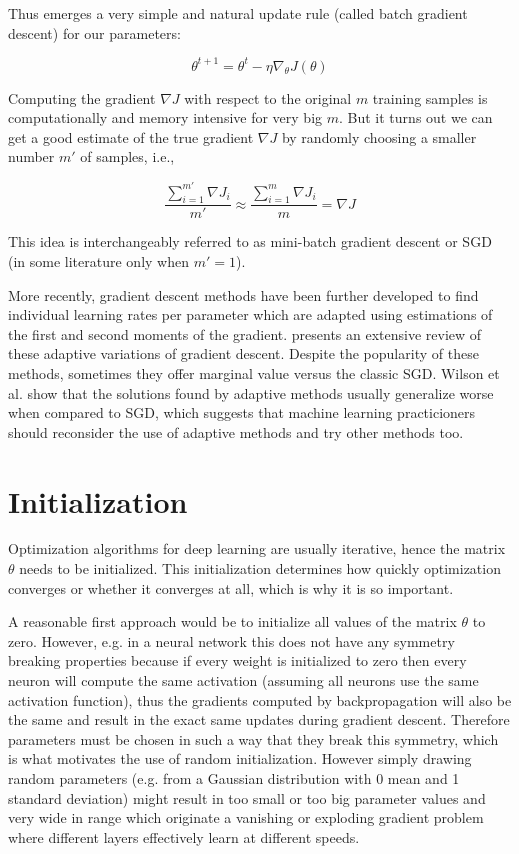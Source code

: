 Thus emerges a very simple and natural update rule (called batch gradient descent) for our parameters:

$$
\theta^{t+1} = \theta^t - \eta \nabla_{\theta} J(\theta)
$$

Computing the gradient $\nabla J$ with respect to the original $m$ training samples is computationally and memory intensive for very big $m$. But it turns out we can get a good estimate of the true gradient $\nabla J$ by randomly choosing a smaller number $m'$ of samples, i.e.,

$$
\frac{\sum_{i=1}^{m'} \nabla J_i}{m'} \approx \frac{\sum_{i=1}^m \nabla J_{i}}{m} = \nabla J
$$

This idea is interchangeably referred to as mini-batch gradient descent or \ac{SGD} (in some literature only when $m' = 1$).

More recently, gradient descent methods have been further developed to find individual learning rates per parameter which are adapted using estimations of the first and second moments of the gradient. \citeauthor{ruder2016} \cite{ruder2016} presents an extensive review of these adaptive variations of gradient descent. Despite the popularity of these methods, sometimes they offer marginal value versus the classic \ac{SGD}. Wilson et al. \cite{wilson2017} show that the solutions found by adaptive methods usually generalize worse when compared to \ac{SGD}, which suggests that machine learning practicioners should reconsider the use of adaptive methods and try other methods too.

\section{Initialization}

Optimization algorithms for deep learning are usually iterative, hence the matrix $\theta$ needs to be initialized. This initialization determines how quickly optimization converges or whether it converges at all, which is why it is so important.

A reasonable first approach would be to initialize all values of the matrix $\theta$ to zero. However, e.g. in a neural network this does not have any symmetry breaking properties because if every weight is initialized to zero then every neuron will compute the same activation (assuming all neurons use the same activation function), thus the gradients computed by backpropagation will also be the same and result in the exact same updates during gradient descent. Therefore parameters must be chosen in such a way that they break this symmetry, which is what motivates the use of random initialization. However simply drawing random parameters (e.g. from a Gaussian distribution with 0 mean and 1 standard deviation) might result in too small or too big parameter values and very wide in range which originate a vanishing or exploding gradient problem where different layers effectively learn at different speeds.

